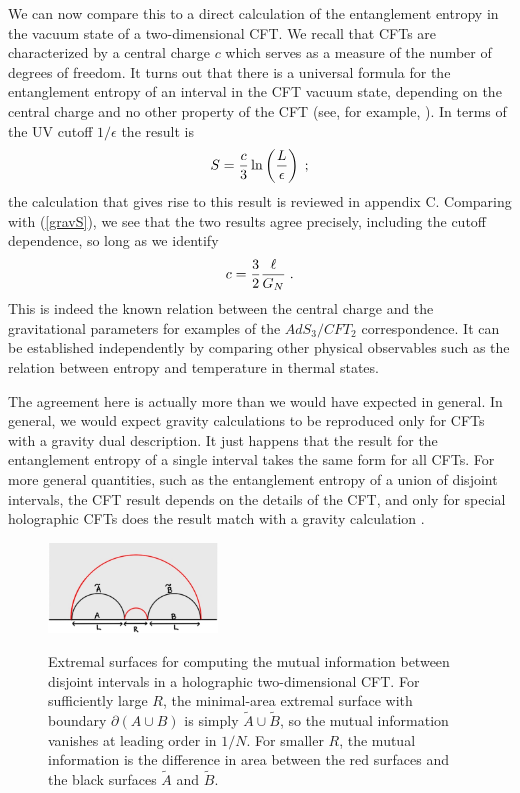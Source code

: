\documentclass[12pt,epsf]{article}
\newcommand{\be}{\begin{equation}}
\newcommand{\ee}{\end{equation}}
\begin{document}
We can now compare this to a direct calculation of the entanglement entropy in the vacuum state of a two-dimensional CFT. We recall that CFTs are characterized by a central charge $c$ which serves as a measure of the number of degrees of freedom. It turns out that there is a universal formula for the entanglement entropy of an interval in the CFT vacuum state, depending on the central charge and no other property of the CFT (see, for example, \cite{Calabrese:2004eu}). In terms of the UV cutoff $1/\epsilon$ the result is
\be
\label{S2D}
S = {c \over 3} \ln \left({L \over \epsilon}\right) \; ;
\ee
the calculation that gives rise to this result is reviewed in appendix C.
Comparing with (\ref{gravS}), we see that the two results agree precisely, including the cutoff dependence, so long as we identify
\be
c = {3 \over 2} {\ell \over G_N} \; .
\ee
This is indeed the known relation between the central charge and the gravitational parameters for examples of the $AdS_3/CFT_2$ correspondence. It can be established independently by comparing other physical observables such as the relation between entropy and temperature in thermal states.

The agreement here is actually more than we would have expected in general. In general, we would expect gravity calculations to be reproduced only for CFTs with a gravity dual description. It just happens that the result for the entanglement entropy of a single interval takes the same form for all CFTs. For more general quantities, such as the entanglement entropy of a union of disjoint intervals, the CFT result depends on the details of the CFT, and only for special holographic CFTs does the result match with a gravity calculation \cite{Hartman:2013mia,Faulkner:2013yia}.

\begin{figure}
\centering
\includegraphics[width=0.4\textwidth]{mutual.eps}\\
\caption{Extremal surfaces for computing the mutual information between disjoint intervals in a holographic two-dimensional CFT. For sufficiently large $R$, the minimal-area extremal surface with boundary $\partial (A \cup B)$ is simply $\tilde{A} \cup \tilde{B}$, so the mutual information vanishes at leading order in $1/N$. For smaller $R$, the mutual information is the difference in area between the red surfaces and the black surfaces $\tilde{A}$ and $\tilde{B}$.}
\label{mutual}
\end{figure}
\end{document}
